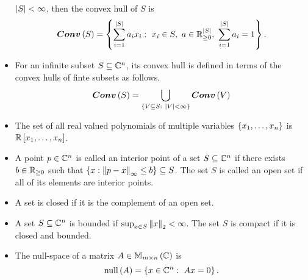 \begin{itemize}
  $\left|S\right|<\infty$, then the convex hull of $S$ is
%
  \[
\bm{Conv}\left(S\right)=\left\{\sum_{i=1}^{\left|S\right|}a_ix_i:~x_i\in
  S,~a\in\mathbb{R}^{\left|S\right|}_{\geq 0},~\sum_{i=1}^{\left|S\right|}a_i=1\right\}.
  \]
\item For an infinite subset $S\subseteq\mathbb{C}^n$, its convex hull is defined in terms of the convex hulls of finte subsets as follows.
%
  \[
\bm{Conv}\left(S\right)=\bigcup_{\left\{V\subseteq S:~\left|V\right|<\infty\right\}}\bm{Conv}\left(V\right)
  \]
\item The set of all real valued polynomials of multiple variables
  $\left\{x_1,\ldots,x_n\right\}$ is $\mathbb{R}\left[x_1,\ldots,x_n\right]$.
\item A point $p\in\mathbb{C}^n$ is called an interior point of a set
  $S\subseteq\mathbb{C}^n$ if there exists $b\in\mathbb{R}_{\geq 0}$ such
  that $\left\{x:\left\|p-x\right\|_{\infty}\leq b\right\}\subseteq S$.  The set $S$ is called
  an open set if all of its elements are interior points.
\item A set is closed if it is the complement of an open set.
\item A set $S\subseteq\mathbb{C}^n$ is bounded if $\sup_{x\in
  S}\left\|x\right\|_2< \infty$.  The set $S$ is compact if it is closed and
  bounded.
\item The null-space of a matrix $A\in\mathbb{M}_{m\times n}\left(\mathbb{C}\right)$ is
  \[
\operatorname{null}\left(A\right)=\left\{x\in\mathbb{C}^n:~Ax=0\right\}.
  \]
\end{itemize}


